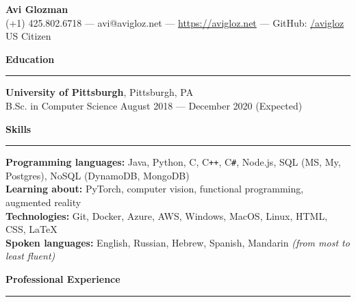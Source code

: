 \documentclass[11pt]{article}
\begin{document}
	\pagestyle{empty}
	\begin{center}
		{\LARGE \textbf{Avi Glozman}}\\
		\vspace{1.25mm}
		{\large (+1) 425.802.6718 --- avi@avigloz.net --- \href{https://avigloz.net}{https://avigloz.net} --- GitHub: \href{https://github.com/avigloz}{/avigloz}}\\
		\vspace{1mm}
		US Citizen
	\end{center}
	
	\begin{flushleft}
		
		\vspace{-1.65mm}
		{\large \raggedright \textbf{Education}}
		\vspace{1.25mm}
	
		\hrule
	
		\vspace{2.25mm}
		\textbf{University of Pittsburgh}, Pittsburgh, PA\\
		{\small B.Sc. in Computer Science \hfill August 2018 --- December 2020 (Expected)}
	
		\vspace{1.5mm}
		{\large \raggedright \textbf{Skills}}
		\vspace{1.25mm}
	
		\hrule
	
		\vspace{2.25mm}
		\textbf{Programming languages:} Java, Python, C, C\texttt{++}, C\verb!#!, Node.js, SQL (MS, My, Postgres), NoSQL (DynamoDB, MongoDB)\\
		\textbf{Learning about:} PyTorch, computer vision, functional programming, augmented reality\\
		\textbf{Technologies:} Git, Docker, Azure, AWS, Windows, MacOS, Linux, HTML, CSS, \LaTeX\\
		\textbf{Spoken languages:} English, Russian, Hebrew, Spanish, Mandarin \textit{(from most to least fluent)}
		
		\vspace{1.35mm}
		{\large \raggedright \textbf{Professional Experience}}
		\vspace{1.25mm}
	
		\hrule


\end{flushleft}
\end{document}
